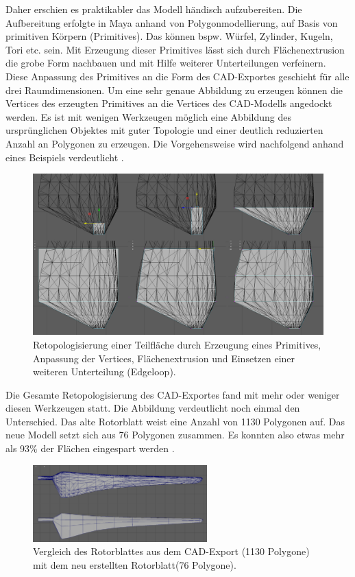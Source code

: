 Daher erschien es praktikabler das Modell händisch aufzubereiten. Die Aufbereitung erfolgte in Maya anhand von Polygonmodellierung, auf Basis von primitiven Körpern (Primitives). Das können bspw. Würfel, Zylinder, Kugeln, Tori etc. sein.  Mit Erzeugung dieser Primitives lässt sich durch Flächenextrusion die grobe Form nachbauen und mit Hilfe weiterer Unterteilungen verfeinern. Diese Anpassung des Primitives an die Form des CAD-Exportes geschieht für alle drei Raumdimensionen. Um eine sehr genaue Abbildung zu erzeugen können die Vertices des erzeugten Primitives an die Vertices des CAD-Modells \glqq angedockt\grqq\, werden. Es ist mit wenigen Werkzeugen möglich eine Abbildung des ursprünglichen Objektes mit guter Topologie und einer deutlich reduzierten Anzahl an Polygonen zu erzeugen. Die Vorgehensweise wird nachfolgend anhand eines Beispiels verdeutlicht .

\begin{figure}[H]
	\centering
	\captionsetup{width=1\textwidth}
	\includegraphics[keepaspectratio, width=1\textwidth]{bildquellen/mod}
	\caption{Retopologisierung einer Teilfläche durch Erzeugung eines Primitives, Anpassung der Vertices, Flächenextrusion und Einsetzen einer weiteren Unterteilung (Edgeloop).}
	\label{fig:2.5}
\end{figure}

Die Gesamte Retopologisierung des CAD-Exportes fand mit mehr oder weniger diesen Werkzeugen statt. Die Abbildung verdeutlicht noch einmal den Unterschied. Das alte Rotorblatt weist eine Anzahl von 1130 Polygonen auf. Das neue Modell setzt sich aus 76 Polygonen zusammen. Es konnten also etwas mehr als 93\% der Flächen eingespart werden . 

\begin{figure}[H]
	\centering
	\captionsetup{width=0.6\textwidth}
	\includegraphics[keepaspectratio, width=0.6\textwidth]{bildquellen/rotorblattGeo}
	\caption{Vergleich des Rotorblattes aus dem CAD-Export (1130 Polygone) mit dem neu erstellten Rotorblatt(76 Polygone).}
	\label{fig:2.6}
\end{figure}

